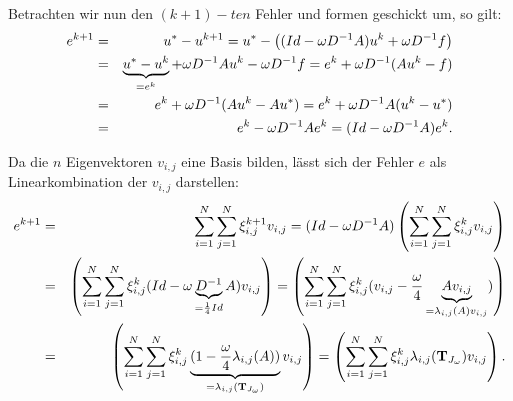 Betrachten wir nun den $(k+1)-ten$ Fehler und formen geschickt um, so gilt:
\begin{eqnarray}
e^{k+1} &=& u^{*} - u^{k+1} = u^{*} - \left( (Id - \omega D^{-1} A)u^{k} + \omega D^{-1}f \right) \notag \\
&=& \underbrace{u^{*} - u^{k}}_{= e^{k}} + \omega D^{-1} A u^{k} - \omega D^{-1}f = e^{k} + \omega D^{-1} (Au^{k} - f) \notag \\
&=& e^{k} + \omega D^{-1} (Au^{k} - Au^{*}) = e^{k} + \omega D^{-1} A(u^{k} - u^{*}) \notag \\
&=& e^{k} - \omega D^{-1} A e^{k} = (Id - \omega D^{-1} A) e^{k}.
\end{eqnarray}


Da die $n$ Eigenvektoren $v_{i,j}$ eine Basis bilden, lässt sich der Fehler $e$ als Linearkombination der $v_{i,j}$ darstellen:
\begin{eqnarray}
e^{k+1} &=& \sum_{i = 1}^{N} \sum_{j = 1}^{N} \xi^{k+1}_{i,j} v_{i,j} = (Id - \omega D^{-1}A) \left(\sum_{i = 1}^{N} \sum_{j = 1}^{N} \xi^{k}_{i,j} v_{i,j}\right) \notag \\
&=& \left(\sum_{i = 1}^{N} \sum_{j = 1}^{N} \xi^{k}_{i,j} (Id - \omega \underbrace{D^{-1}}_{=\frac{1}{4} Id} A) v_{i,j}\right) = \left(\sum_{i = 1}^{N} \sum_{j = 1}^{N} \xi^{k}_{i,j} (v_{i,j} - \frac {\omega} {4} \underbrace{A v_{i,j}}_{= \lambda_{i,j}(A)v_{i,j}})\right) \notag \\
&=& \left(\sum_{i = 1}^{N} \sum_{j = 1}^{N} \xi^{k}_{i,j} \underbrace{(1 - \frac {\omega} {4} \lambda_{i,j}(A))}_{= \lambda_{i,j}({\textbf{T}}_{J_{\omega}})} v_{i,j}\right) = \left(\sum_{i = 1}^{N} \sum_{j = 1}^{N} \xi^{k}_{i,j} \lambda_{i,j}({\textbf{T}}_{J_{\omega}}) v_{i,j}\right).
\end{eqnarray}

\label{img.Jacobi2}

